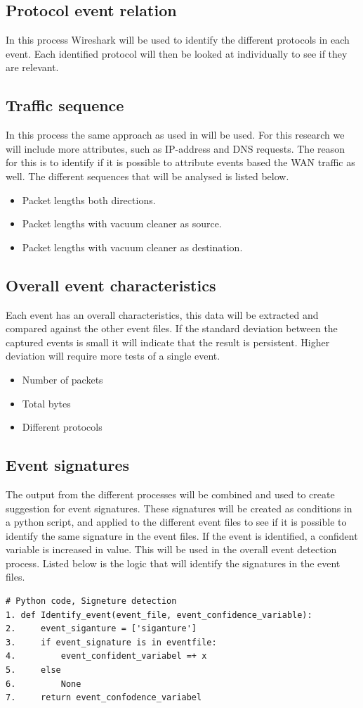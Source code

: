\subsection{Protocol event relation}
In this process Wireshark will be used to identify the different protocols in each event. Each identified protocol will then be looked at individually to see if they are relevant. 

\subsection{Traffic sequence}
In this process the same approach as used in \cite{pingpong} will be used. For this research we will include more attributes, such as IP-address and DNS requests. The reason for this is to identify if it is possible to attribute events based the WAN traffic as well. The different sequences that will be analysed is listed below.  
\begin{itemize}
    \item Packet lengths both directions.
    \item Packet lengths with vacuum cleaner as source.
    \item Packet lengths with vacuum cleaner as destination.
\end{itemize}

\subsection{Overall event characteristics}
Each event has an overall characteristics, this data will be extracted and compared against the other event files. If the standard deviation between the captured events is small it will indicate that the result is persistent. Higher deviation will require more tests of a single event.
\begin{itemize}
    \item Number of packets
    \item Total bytes
    \item Different protocols
\end{itemize}

\subsection{Event signatures}
The output from the different processes will be combined and used to create suggestion for event signatures. These signatures will be created as conditions in a python script, and applied to the different event files to see if it is possible to identify the same signature in the event files. 
If the event is identified, a confident variable is increased in value. This will be used in the overall event detection process. Listed below is the logic that will identify the signatures in the event files.
\begin{lstlisting}
# Python code, Signeture detection
1. def Identify_event(event_file, event_confidence_variable):
2.     event_siganture = ['siganture']
3.     if event_signature is in eventfile:
4.         event_confident_variabel =+ x
5.     else
6.         None
7.     return event_confodence_variabel
\end{lstlisting}

